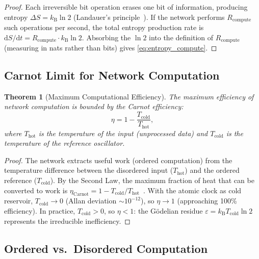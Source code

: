 \documentclass[11pt,twocolumn,a4paper]{article}
\newtheorem{theorem}{Theorem}[section]
\theoremstyle{definition}
\newcommand{\kB}{k_{\mathrm{B}}}
\newcommand{\eps}{\varepsilon}
\newcommand{\dif}{\mathrm{d}}
\begin{document}
\begin{proof}
Each irreversible bit operation erases one bit of information, producing entropy
$\Delta S = \kB \ln 2$ (Landauer's principle~\cite{landauer1961}). If the network
performs $R_{\mathrm{compute}}$ such operations per second, the total entropy production
rate is $\dif S/\dif t = R_{\mathrm{compute}} \cdot \kB \ln 2$. Absorbing the $\ln 2$
into the definition of $R_{\mathrm{compute}}$ (measuring in nats rather than bits) gives
\eqref{eq:entropy_compute}.
\end{proof}

\subsection{Carnot Limit for Network Computation}\label{sec:ep:carnot}

\begin{theorem}[Maximum Computational Efficiency]\label{thm:carnot}
The maximum efficiency of network computation is bounded by the Carnot efficiency:
\begin{equation}\label{eq:carnot}
  \eta = 1 - \frac{T_{\mathrm{cold}}}{T_{\mathrm{hot}}},
\end{equation}
where $T_{\mathrm{hot}}$ is the temperature of the input (unprocessed data) and
$T_{\mathrm{cold}}$ is the temperature of the reference oscillator.
\end{theorem}

\begin{proof}
The network extracts useful work (ordered computation) from the temperature difference
between the disordered input ($T_{\mathrm{hot}}$) and the ordered reference
($T_{\mathrm{cold}}$). By the Second Law, the maximum fraction of heat that can be
converted to work is $\eta_{\mathrm{Carnot}} = 1 - T_{\mathrm{cold}}/T_{\mathrm{hot}}$~\cite{pathria2011}.
With the atomic clock as cold reservoir, $T_{\mathrm{cold}} \to 0$
(Allan deviation $\sim 10^{-12}$), so $\eta \to 1$ (approaching 100\% efficiency).
In practice, $T_{\mathrm{cold}} > 0$, so $\eta < 1$: the G\"odelian residue
$\eps = \kB T_{\mathrm{cold}} \ln 2$ represents the irreducible inefficiency.
\end{proof}

\subsection{Ordered vs.\ Disordered Computation}\label{sec:ep:ordered}
\end{document}
